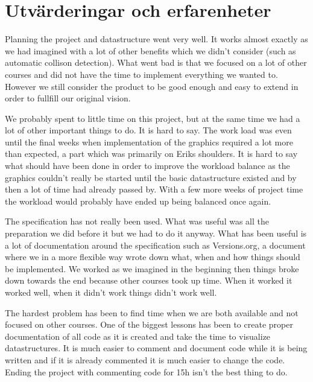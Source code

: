 \documentclass[12pt,a4paper]{article}
\begin{document}
\section{Utvärderingar och erfarenheter}


Planning the project and datastructure went very well. It works almost exactly as we had imagined with a lot of other benefits which we didn't consider (such as automatic collison detection). What went bad is that we focused on a lot of other courses and did not have the time to implement everything we wanted to. However we still consider the product to be good enough and easy to extend in order to fullfill our original vision.


We probably spent to little time on this project, but at the same time we had a lot of other important things to do. It is hard to say.
The work load was even until the final weeks when implementation of the graphics required a lot more than expected, a part which was primarily on Eriks shoulders.
It is hard to say what should have been done in order to improve the workload balance as the graphics couldn't really be started until the basic datastructure existed and by then a lot of time had already passed by. With a few more weeks of project time the workload would probably have ended up being balanced once again.


The specification has not really been used. What was useful was all the preparation we did before it but we had to do it anyway.
What has been useful is a lot of documentation around the specification such as Versions.org, a document where we in a more flexible way wrote down what, when and how things should be implemented.
We worked as we imagined in the beginning then things broke down towards the end because other courses took up time. When it worked it worked well, when it didn't work things didn't work well.


The hardest problem has been to find time when we are both available and not focused on other courses.
One of the biggest lessons has been to create proper documentation of all code as it is created and take the time to visualize datastructures.
It is much easier to comment and document code while it is being written and if it is already commented it is much easier to change the code.
Ending the project with commenting code for 15h isn't the best thing to do.
\end{document}

